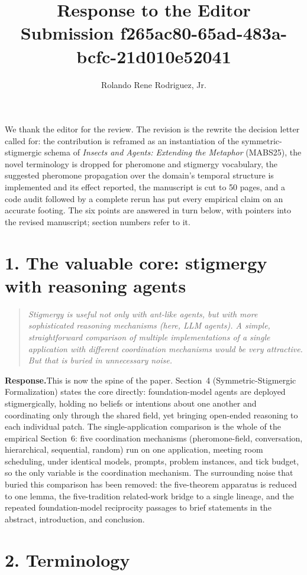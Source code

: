 \documentclass[11pt]{article}
\title{Response to the Editor\\[0.3em]\large Submission f265ac80-65ad-483a-bcfc-21d010e52041}
\author{Rolando Rene Rodriguez, Jr.}
\date{}
\newcommand{\quoted}[1]{\begin{quote}\itshape #1\end{quote}}
\newcommand{\response}{\par\smallskip\noindent\textbf{Response.}\space}
\begin{document}
\maketitle

We thank the editor for the review. The revision is the rewrite the decision letter called for: the contribution is reframed as an instantiation of the symmetric-stigmergic schema of \emph{Insects and Agents: Extending the Metaphor} (MABS25), the novel terminology is dropped for pheromone and stigmergy vocabulary, the suggested pheromone propagation over the domain's temporal structure is implemented and its effect reported, the manuscript is cut to 50 pages, and a code audit followed by a complete rerun has put every empirical claim on an accurate footing. The six points are answered in turn below, with pointers into the revised manuscript; section numbers refer to it.

\section*{1. The valuable core: stigmergy with reasoning agents}

\quoted{Stigmergy is useful not only with ant-like agents, but with more sophisticated reasoning mechanisms (here, LLM agents). A simple, straightforward comparison of multiple implementations of a single application with different coordination mechanisms would be very attractive. But that is buried in unnecessary noise.}

\response This is now the spine of the paper. Section~4 (Symmetric-Stigmergic Formalization) states the core directly: foundation-model agents are deployed stigmergically, holding no beliefs or intentions about one another and coordinating only through the shared field, yet bringing open-ended reasoning to each individual patch. The single-application comparison is the whole of the empirical Section~6: five coordination mechanisms (pheromone-field, conversation, hierarchical, sequential, random) run on one application, meeting room scheduling, under identical models, prompts, problem instances, and tick budget, so the only variable is the coordination mechanism. The surrounding noise that buried this comparison has been removed: the five-theorem apparatus is reduced to one lemma, the five-tradition related-work bridge to a single lineage, and the repeated foundation-model reciprocity passages to brief statements in the abstract, introduction, and conclusion.

\section*{2. Terminology}
\end{document}
